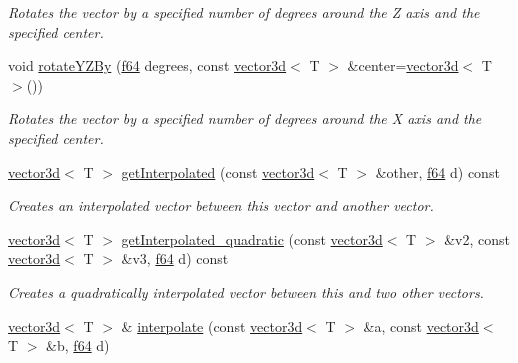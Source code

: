 \begin{DoxyCompactItemize}
\begin{DoxyCompactList}\small\item\em Rotates the vector by a specified number of degrees around the Z axis and the specified center. \end{DoxyCompactList}\item 
void \hyperlink{classirr_1_1core_1_1vector3d_aaa048312f75f152861479cb48e2ddfe4}{rotate\+Y\+Z\+By} (\hyperlink{namespaceirr_a1325b02603ad449f92c68fc640af9b28}{f64} degrees, const \hyperlink{classirr_1_1core_1_1vector3d}{vector3d}$<$ T $>$ \&center=\hyperlink{classirr_1_1core_1_1vector3d}{vector3d}$<$ T $>$())
\begin{DoxyCompactList}\small\item\em Rotates the vector by a specified number of degrees around the X axis and the specified center. \end{DoxyCompactList}\item 
\hyperlink{classirr_1_1core_1_1vector3d}{vector3d}$<$ T $>$ \hyperlink{classirr_1_1core_1_1vector3d_aee3351232fa6ebd6241a89bebdaeaedf}{get\+Interpolated} (const \hyperlink{classirr_1_1core_1_1vector3d}{vector3d}$<$ T $>$ \&other, \hyperlink{namespaceirr_a1325b02603ad449f92c68fc640af9b28}{f64} d) const
\begin{DoxyCompactList}\small\item\em Creates an interpolated vector between this vector and another vector. \end{DoxyCompactList}\item 
\hyperlink{classirr_1_1core_1_1vector3d}{vector3d}$<$ T $>$ \hyperlink{classirr_1_1core_1_1vector3d_aacaa4bbf35d509b1264d1e8e2d48360e}{get\+Interpolated\+\_\+quadratic} (const \hyperlink{classirr_1_1core_1_1vector3d}{vector3d}$<$ T $>$ \&v2, const \hyperlink{classirr_1_1core_1_1vector3d}{vector3d}$<$ T $>$ \&v3, \hyperlink{namespaceirr_a1325b02603ad449f92c68fc640af9b28}{f64} d) const
\begin{DoxyCompactList}\small\item\em Creates a quadratically interpolated vector between this and two other vectors. \end{DoxyCompactList}\item 
\hyperlink{classirr_1_1core_1_1vector3d}{vector3d}$<$ T $>$ \& \hyperlink{classirr_1_1core_1_1vector3d_a32a888e0f608a20deee98c794a321c4c}{interpolate} (const \hyperlink{classirr_1_1core_1_1vector3d}{vector3d}$<$ T $>$ \&a, const \hyperlink{classirr_1_1core_1_1vector3d}{vector3d}$<$ T $>$ \&b, \hyperlink{namespaceirr_a1325b02603ad449f92c68fc640af9b28}{f64} d)

\end{DoxyCompactItemize}
